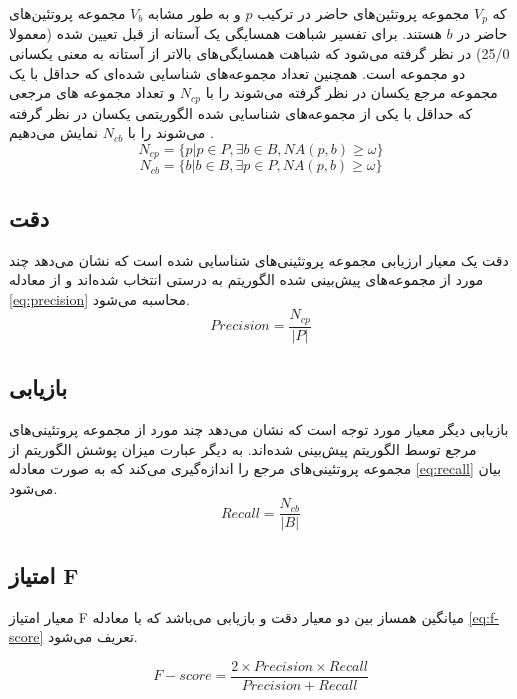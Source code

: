 که $V_p$ مجموعه پروتئین‌های حاضر در ترکیب $p$ و به طور مشابه $V_b$ مجموعه پروتئین‌های حاضر در $b$ هستند. برای تفسیر شباهت همسایگی یک آستانه از قبل تعیین شده (معمولا 25/0) در نظر گرفته می‌شود که شباهت همسایگی‌های بالاتر از آستانه به معنی یکسانی دو مجموعه است. همچنین تعداد مجموعه‌های شناسایی شده‌ای که حداقل با یک مجموعه مرجع یکسان در نظر گرفته می‌شوند را با $N_{cp}$ و تعداد مجموعه های مرجعی که حداقل با یکی از مجموعه‌های شناسایی شده الگوریتمی یکسان در نظر گرفته می‌شوند را با $N_{cb}$ نمایش می‌دهیم \cite{spectral}.
\begin{equation}
N_{cp} = \{p | p \in P, \exists b \in B, NA(p,b) \ge \omega\}
\end{equation}
\begin{equation}
N_{cb} = \{b | b \in B, \exists p \in P, NA(p,b) \ge \omega\}
\end{equation}

\subsection{دقت}
دقت یک معیار ارزیابی مجموعه پروتئینی‌های شناسایی شده است که نشان می‌دهد چند مورد از مجموعه‌های پیش‌بینی شده الگوریتم به درستی انتخاب شده‌اند و از معادله \ref{eq:precision} محاسبه می‌شود.
\begin{equation}
Precision = \frac{N_{cp}}{|P|}
\label{eq:precision}
\end{equation}

\subsection{بازیابی}
بازیابی دیگر معیار مورد توجه است که نشان می‌دهد چند مورد از مجموعه پروتئینی‌های مرجع توسط الگوریتم پیش‌بینی شده‌اند. به دیگر عبارت میزان پوشش الگوریتم از مجموعه پروتئینی‌های مرجع را اندازه‌گیری می‌کند که به صورت معادله \ref{eq:recall} بیان می‌شود.
\begin{equation}
Recall = \frac{N_{cb}}{|B|}
\label{eq:recall}
\end{equation}

\subsection{امتیاز F}
معیار امتیاز F میانگین همساز بین دو معیار دقت و بازیابی می‌باشد که با معادله \ref{eq:f-score} تعریف می‌شود.

\begin{equation}
F-score = \frac{2 \times Precision \times Recall}{Precision + Recall}
\label{eq:f-score}
\end{equation}

